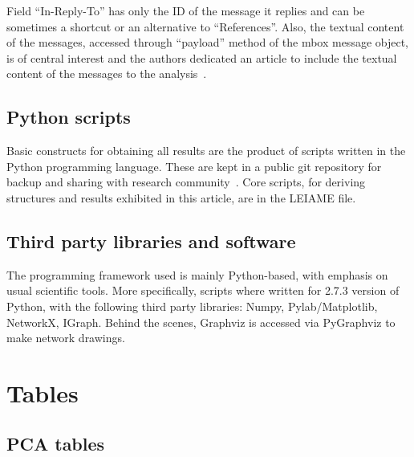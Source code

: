 \documentclass[%
 aip,
 jmp,%
 amsmath,amssymb,
 reprint,%
]{revtex4-1}
\begin{document}
Field ``In-Reply-To'' has only the ID of the message it replies and can be sometimes
a shortcut or an alternative to ``References''. Also, the textual content of the messages,
accessed through ``payload'' method of the mbox message object, is of central interest and
the authors dedicated an article to include the textual content of the messages to the analysis~\cite{rcText}.

\subsection{Python scripts}\label{ap:os}
Basic constructs for obtaining all results are the product of scripts written in the Python programming language. These are kept in a public git repository for backup and sharing with research community~\cite{scriptsFim}. Core scripts, for deriving structures and results exhibited in this article, are in the LEIAME file.


\subsection{Third party libraries and software}
The programming framework used 
is mainly Python-based, with emphasis on usual
scientific tools. More specifically,
scripts where written for 2.7.3 version of Python,
with the following third party libraries: Numpy, Pylab/Matplotlib, NetworkX, IGraph.
Behind the scenes, Graphviz is accessed via PyGraphviz to make network drawings.
\section{Tables}\label{sectables}
\clearpage
\subsection{PCA tables}\label{sec:pcat}
\end{document}
